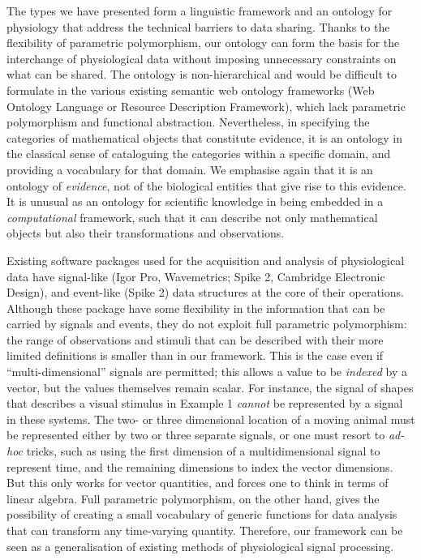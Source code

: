 \documentclass[11pt]{article}
\begin{document}
The types we have presented form a linguistic framework and an
ontology for physiology that address the technical barriers to data
sharing. Thanks to the flexibility of parametric polymorphism, our
ontology can form the basis for the interchange of physiological data
without imposing unnecessary constraints on what can be shared. The
ontology is non-hierarchical and would be difficult to formulate in the
various existing semantic web ontology frameworks (Web Ontology
Language or Resource Description Framework), which lack parametric
polymorphism and functional abstraction. Nevertheless, in specifying
the categories of mathematical objects that constitute evidence, it is
an ontology in the classical sense of cataloguing the categories within
a specific domain, and providing a vocabulary for that domain. We
emphasise again that it is an ontology of \emph{evidence}, not of the
biological entities that give rise to this evidence. It is unusual as
an ontology for scientific knowledge in being embedded in a
\emph{computational} framework, such that it can describe not only
mathematical objects but also their transformations and observations.

Existing software packages used for the acquisition and analysis of
physiological data have signal-like (Igor Pro, Wavemetrics; Spike 2,
Cambridge Electronic Design), and event-like (Spike 2) data structures
at the core of their operations. Although these package have some
flexibility in the information that can be carried by signals and
events, they do not exploit full parametric polymorphism: the range of
observations and stimuli that can be described with their more limited
definitions is smaller than in our framework. This is the case even if
``multi-dimensional'' signals are permitted; this allows a value to
be \emph{indexed} by a vector, but the values themselves remain
scalar. For instance, the signal of shapes that describes a visual
stimulus in Example 1 \emph{cannot} be represented by a signal in
these systems. The two- or three dimensional location of a moving
animal must be represented either by two or three separate signals, or
one must resort to \emph{ad-hoc} tricks, such as using the first
dimension of a multidimensional signal to represent time, and the
remaining dimensions to index the vector dimensions. But this only
works for vector quantities, and forces one to think in terms of linear
algebra. Full parametric polymorphism, on the other hand, gives the
possibility of creating a small vocabulary of generic functions for
data analysis that can transform any time-varying quantity. Therefore,
our framework can be seen as a generalisation of existing methods of
physiological signal processing.
\end{document}
